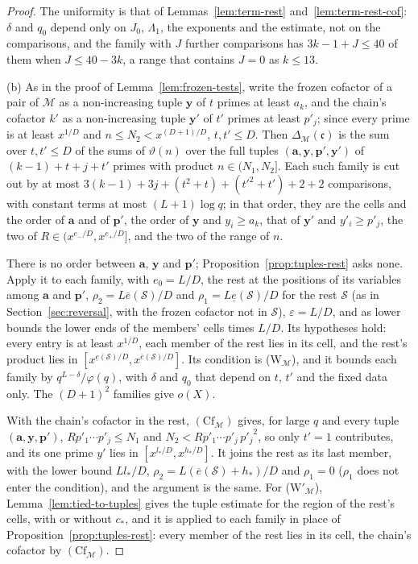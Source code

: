 \documentclass[11pt]{article}
\theoremstyle{definition}
\begin{document}
\begin{proof}
The uniformity is that of Lemmas~\ref{lem:term-rest} and~\ref{lem:term-rest-cof}: $\delta$ and $q_0$ depend only on
$J_0$, $\Lambda_1$, the exponents and the estimate, not on the comparisons, and the family with $J$ further
comparisons has $3k - 1 + J \le 40$ of them when $J \le 40 - 3k$, a range that contains $J = 0$ as $k \le 13$.

(b) As in the proof of Lemma~\ref{lem:frozen-tests}, write the frozen cofactor of a pair of $\mathcal M$ as a
non-increasing tuple $\mathbf y$ of $t$ primes at least $a_k$, and the chain's cofactor $k'$ as
a non-increasing tuple $\mathbf y'$ of $t'$ primes at
least $p'_j$; since every prime is at least $x^{1/D}$ and $n \le N_2 < x^{(D + 1)/D}$, $t, t' \le D$. Then
$\Delta_{\mathcal M}(\mathfrak c)$ is the sum over $t, t' \le D$ of the sums of $\vartheta(n)$ over the full tuples
$(\mathbf a, \mathbf y, \mathbf p', \mathbf y')$ of $(k - 1) + t + j + t'$ primes with product $n \in (N_1, N_2]$. Each
such family is cut out by at most $3(k - 1) + 3j + (t^2 + t) + (t'^2 + t') + 2 + 2$ comparisons, with constant terms at
most $(L + 1)\log q$; in that order, they are the cells and the order of $\mathbf a$ and of $\mathbf p'$, the order of
$\mathbf y$ and $y_i \ge a_k$, that of $\mathbf y'$ and $y'_i \ge p'_j$, the two of $R \in (x^{e_-/D}, x^{e_+/D}]$, and
the two of the range of $n$.

There is no order between $\mathbf a$, $\mathbf y$ and $\mathbf p'$; Proposition~\ref{prop:tuples-rest} asks none.
Apply it to each family, with $e_0 = L/D$, the rest at the positions of its variables among $\mathbf a$ and $\mathbf
p'$, $\rho_2 = L\overline e(\mathcal S)/D$ and $\rho_1 = L\underline e(\mathcal S)/D$ for the rest $\mathcal S$ (as in
Section~\ref{sec:reversal}, with the frozen cofactor not in $\mathcal S$), $\varepsilon = L/D$, and as lower bounds
the lower ends of the members' cells times $L/D$. Its hypotheses hold: every entry is at least $x^{1/D}$, each member
of the rest lies in its cell, and the rest's product lies in $[x^{\underline e(\mathcal S)/D}, x^{\overline e(\mathcal
S)/D}]$. Its condition is (W$_{\mathcal M}$), and it bounds each family by $q^{L - \delta}/\varphi(q)$, with $\delta$
and $q_0$ that depend on $t$, $t'$ and the fixed data only. The $(D + 1)^2$ families give $o(X)$.

With the chain's cofactor in the rest, $(\mathrm{Cf}_{\mathcal M})$ gives, for large $q$ and every tuple $(\mathbf a,
\mathbf y, \mathbf p')$, $R p'_1 \cdots p'_j \le N_1$ and $N_2 < R p'_1 \cdots p'_j\, {p'_j}^2$, so only $t' = 1$
contributes, and its one prime $y'$ lies in $[x^{l_*/D}, x^{h_*/D}]$. It joins the rest as its last member, with the
lower bound $Ll_*/D$, $\rho_2 = L(\overline e(\mathcal S) + h_*)/D$ and $\rho_1 = 0$ ($\rho_1$ does not enter the
condition), and the argument is the same. For
(W$'_{\mathcal M}$), Lemma~\ref{lem:tied-to-tuples} gives the tuple estimate for the region of the rest's cells, with or
without $c_*$, and it is applied to each family in place of Proposition~\ref{prop:tuples-rest}: every member of the
rest lies in its cell, the chain's cofactor by $(\mathrm{Cf}_{\mathcal M})$.
\end{proof}
\end{document}
